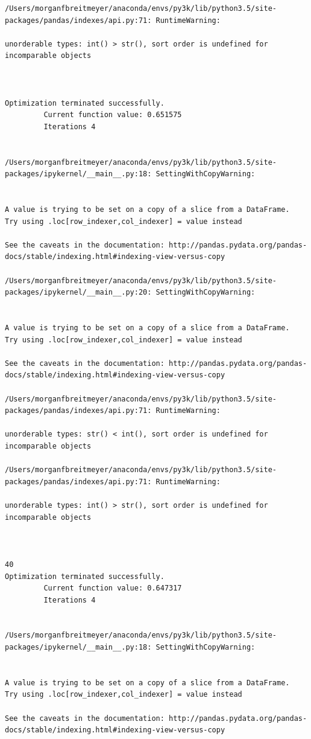 \begin{lstlisting}
/Users/morganfbreitmeyer/anaconda/envs/py3k/lib/python3.5/site-packages/pandas/indexes/api.py:71: RuntimeWarning:

unorderable types: int() > str(), sort order is undefined for incomparable objects



Optimization terminated successfully.
         Current function value: 0.651575
         Iterations 4


/Users/morganfbreitmeyer/anaconda/envs/py3k/lib/python3.5/site-packages/ipykernel/__main__.py:18: SettingWithCopyWarning:


A value is trying to be set on a copy of a slice from a DataFrame.
Try using .loc[row_indexer,col_indexer] = value instead

See the caveats in the documentation: http://pandas.pydata.org/pandas-docs/stable/indexing.html#indexing-view-versus-copy

/Users/morganfbreitmeyer/anaconda/envs/py3k/lib/python3.5/site-packages/ipykernel/__main__.py:20: SettingWithCopyWarning:


A value is trying to be set on a copy of a slice from a DataFrame.
Try using .loc[row_indexer,col_indexer] = value instead

See the caveats in the documentation: http://pandas.pydata.org/pandas-docs/stable/indexing.html#indexing-view-versus-copy

/Users/morganfbreitmeyer/anaconda/envs/py3k/lib/python3.5/site-packages/pandas/indexes/api.py:71: RuntimeWarning:

unorderable types: str() < int(), sort order is undefined for incomparable objects

/Users/morganfbreitmeyer/anaconda/envs/py3k/lib/python3.5/site-packages/pandas/indexes/api.py:71: RuntimeWarning:

unorderable types: int() > str(), sort order is undefined for incomparable objects



40
Optimization terminated successfully.
         Current function value: 0.647317
         Iterations 4


/Users/morganfbreitmeyer/anaconda/envs/py3k/lib/python3.5/site-packages/ipykernel/__main__.py:18: SettingWithCopyWarning:


A value is trying to be set on a copy of a slice from a DataFrame.
Try using .loc[row_indexer,col_indexer] = value instead

See the caveats in the documentation: http://pandas.pydata.org/pandas-docs/stable/indexing.html#indexing-view-versus-copy


\end{lstlisting}
